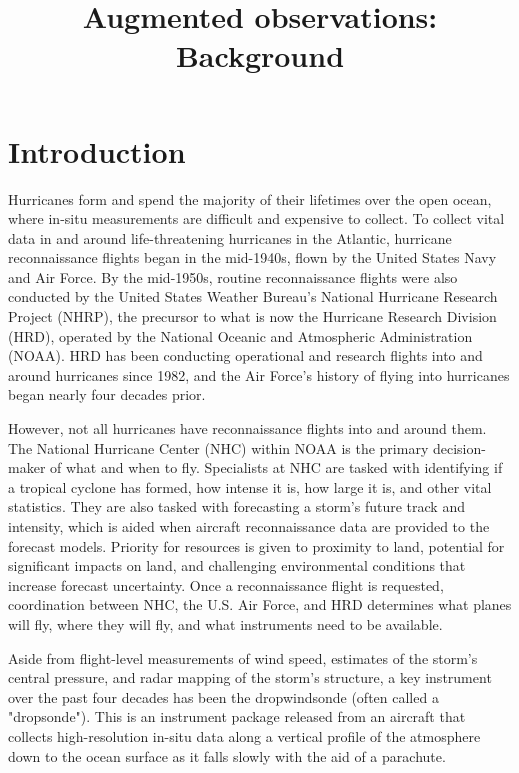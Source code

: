 \documentclass{article}
\title{Augmented observations: Background}
\begin{document}

\section{Introduction}

Hurricanes form and spend the majority of their lifetimes over the open ocean, where in-situ measurements are difficult and expensive to collect. To collect vital data in and around life-threatening hurricanes in the Atlantic, hurricane reconnaissance flights began in the mid-1940s, flown by the United States Navy and Air Force. By the mid-1950s, routine reconnaissance flights were also conducted by the United States Weather Bureau’s National Hurricane Research Project (NHRP), the precursor to what is now the Hurricane Research Division (HRD), operated by the National Oceanic and Atmospheric Administration (NOAA). HRD has been conducting operational and research flights into and around hurricanes since 1982, and the Air Force's history of flying into hurricanes began nearly four decades prior.

However, not all hurricanes have reconnaissance flights into and around them. The National Hurricane Center (NHC) within NOAA is the primary decision-maker of what and when to fly. Specialists at NHC are tasked with identifying if a tropical cyclone has formed, how intense it is, how large it is, and other vital statistics. They are also tasked with forecasting a storm's future track and intensity, which is aided when aircraft reconnaissance data are provided to the forecast models. Priority for resources is given to proximity to land, potential for significant impacts on land, and challenging environmental conditions that increase forecast uncertainty. Once a reconnaissance flight is requested, coordination between NHC, the U.S. Air Force, and HRD determines what planes will fly, where they will fly, and what instruments need to be available.

Aside from flight-level measurements of wind speed, estimates of the storm's central pressure, and radar mapping of the storm's structure, a key instrument over the past four decades has been the dropwindsonde (often called a "dropsonde"). This is an instrument package released from an aircraft that collects high-resolution in-situ data along a vertical profile of the atmosphere down to the ocean surface as it falls slowly with the aid of a parachute.
\end{document}
